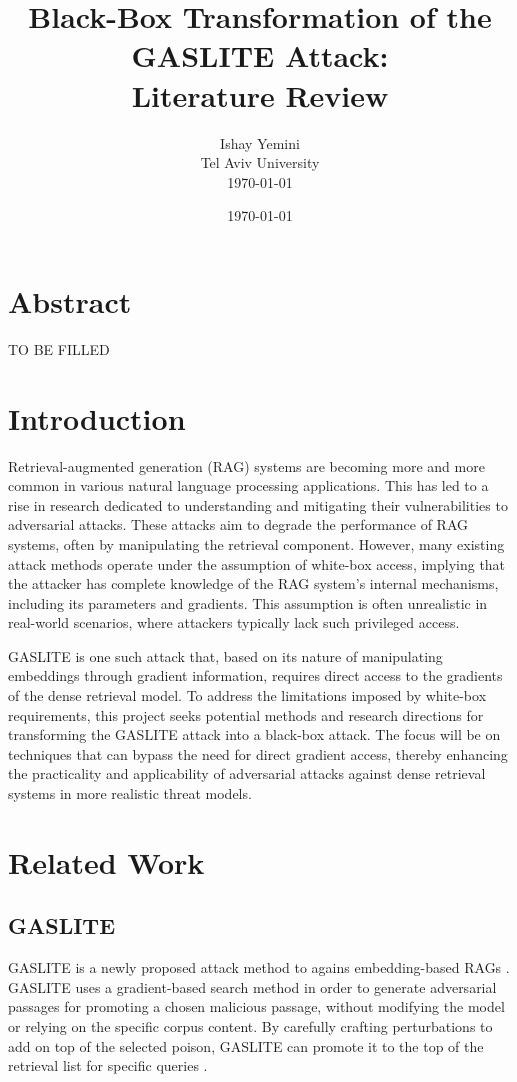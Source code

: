 \documentclass[a4paper, sigconf]{acmart}
\title{Black-Box Transformation of the GASLITE Attack: \\Literature Review}
\author{Ishay Yemini\\Tel Aviv University\\ \today}
\date{\today}
\begin{document}
\maketitle

\section{Abstract}

TO BE FILLED

\section{Introduction}

Retrieval-augmented generation (RAG) systems are becoming more and more common in various natural language processing applications. This has led to a rise in research dedicated to understanding and mitigating their vulnerabilities to adversarial attacks. These attacks aim to degrade the performance of RAG systems, often by manipulating the retrieval component. However, many existing attack methods operate under the assumption of white-box access, implying that the attacker has complete knowledge of the RAG system's internal mechanisms, including its parameters and gradients. This assumption is often unrealistic in real-world scenarios, where attackers typically lack such privileged access. 

GASLITE is one such attack that, based on its nature of manipulating embeddings through gradient information, requires direct access to the gradients of the dense retrieval model. To address the limitations imposed by white-box requirements, this project seeks potential methods and research directions for transforming the GASLITE attack into a black-box attack. The focus will be on techniques that can bypass the need for direct gradient access, thereby enhancing the practicality and applicability of adversarial attacks against dense retrieval systems in more realistic threat models.


\section{Related Work}

\subsection{GASLITE}

GASLITE is a newly proposed attack method to agains embedding-based RAGs \cite{bentov2024}. 
GASLITE uses a gradient-based search method in order to generate adversarial passages for promoting a chosen malicious passage, without modifying the model or relying on the specific corpus content. 
By carefully crafting perturbations to add on top of the selected poison, GASLITE can promote it to the top of the retrieval list for specific queries \cite{bentov2024}.
\end{document}
